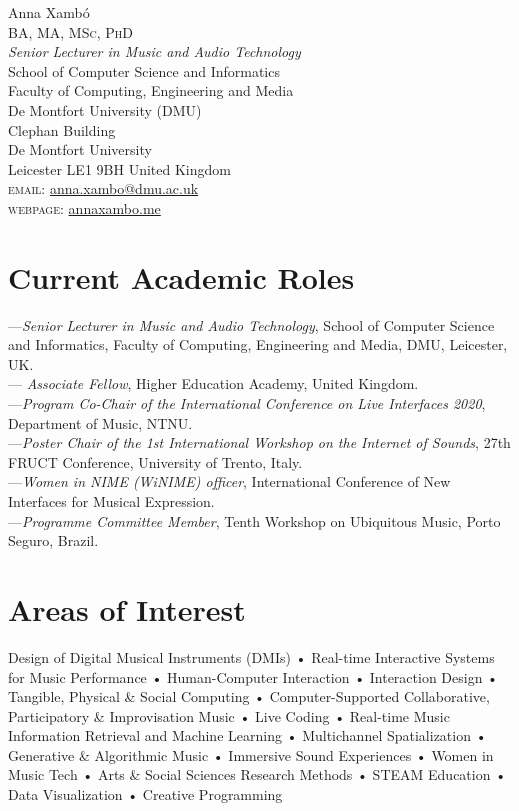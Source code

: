 \documentclass[10pt, a4paper]{article}
\begin{document}
{\Huge Anna Xambó}\\[0.1cm]
\textsc{BA, MA, MSc, PhD}\\[0.9cm]
\emph{Senior Lecturer in Music and Audio Technology}\\
School of Computer Science and Informatics\\
Faculty of Computing, Engineering and Media\\
De Montfort University (DMU)\\
Clephan Building \\
De Montfort University\\
Leicester LE1 9BH United Kingdom\\[.2cm]
\textsc{email}: \href{mailto:anna.xambo@dmu.ac.uk}{anna.xambo@dmu.ac.uk}\\
\textsc{webpage}: \href{http://annaxambo.me/}{annaxambo.me}\\ 

\section*{Current Academic Roles}
---\emph{Senior Lecturer in Music and Audio Technology}, School of Computer Science and Informatics, Faculty of Computing, Engineering and Media, DMU, Leicester, UK.\\
---\emph{ Associate Fellow}, Higher Education Academy, United Kingdom.\\
---\emph{Program Co-Chair of the International Conference on Live Interfaces 2020}, Department of Music, NTNU.\\
---\emph{Poster Chair of the 1st International Workshop on the Internet of Sounds}, 27th FRUCT Conference, University of Trento, Italy.\\
---\emph{Women in NIME (WiNIME) officer}, International Conference of New Interfaces for Musical Expression.\\
---\emph{Programme Committee Member}, Tenth Workshop on Ubiquitous Music, Porto Seguro, Brazil.

\section*{Areas of Interest}
Design of Digital Musical Instruments (DMIs) • Real-time Interactive Systems for Music Performance • Human-Computer Interaction • Interaction Design • Tangible, Physical \& Social Computing • Computer-Supported Collaborative, Participatory \& Improvisation Music • Live Coding • Real-time Music Information Retrieval and Machine Learning • Multichannel Spatialization • Generative \& Algorithmic Music • Immersive Sound Experiences • Women in Music Tech • Arts \& Social Sciences Research Methods • STEAM Education • Data Visualization • Creative Programming
\end{document}

